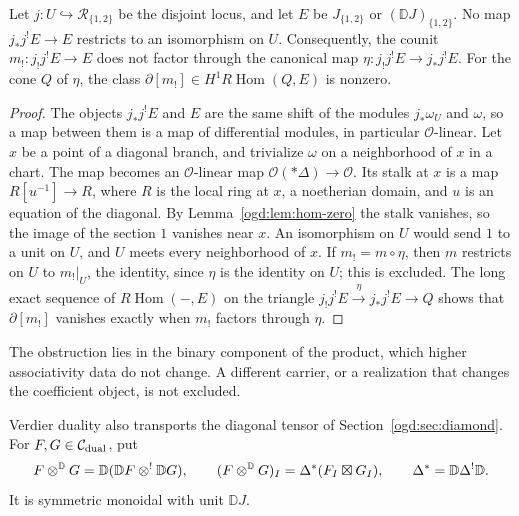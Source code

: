 \begin{corollary}\label{ogd:cor:no-extension}
Let \(j:U\hookrightarrow\mathscr R_{\{1,2\}}\) be the disjoint locus, and let \(E\) be \(J_{\{1,2\}}\) or \((\mathbb DJ)_{\{1,2\}}\).
No map \(j_*j^!E\to E\) restricts to an isomorphism on \(U\).
Consequently, the counit \(m_!:j_!j^!E\to E\) does not factor through the canonical map \(\eta:j_!j^!E\to j_*j^!E\).
For the cone \(Q\) of \(\eta\), the class \(\partial[m_!]\in H^1R\operatorname{Hom}(Q,E)\) is nonzero.
\end{corollary}
\begin{proof}
The objects \(j_*j^!E\) and \(E\) are the same shift of the modules \(j_*\omega_U\) and \(\omega\), so a map between them is a map of differential modules, in particular \(\mathcal O\)-linear.
Let \(x\) be a point of a diagonal branch, and trivialize \(\omega\) on a neighborhood of \(x\) in a chart.
The map becomes an \(\mathcal O\)-linear map \(\mathcal O(*\Delta)\to\mathcal O\).
Its stalk at \(x\) is a map \(R[u^{-1}]\to R\), where \(R\) is the local ring at \(x\), a noetherian domain, and \(u\) is an equation of the diagonal.
By Lemma~\ref{ogd:lem:hom-zero} the stalk vanishes, so the image of the section \(1\) vanishes near \(x\).
An isomorphism on \(U\) would send \(1\) to a unit on \(U\), and \(U\) meets every neighborhood of \(x\).
If \(m_!=m\circ\eta\), then \(m\) restricts on \(U\) to \(m_!|_U\), the identity, since \(\eta\) is the identity on \(U\); this is excluded.
The long exact sequence of \(R\operatorname{Hom}(-,E)\) on the triangle \(j_!j^!E\xrightarrow{\eta}j_*j^!E\to Q\) shows that \(\partial[m_!]\) vanishes exactly when \(m_!\) factors through \(\eta\).
\end{proof}

The obstruction lies in the binary component of the product, which higher associativity data do not change.
A different carrier, or a realization that changes the coefficient object, is not excluded.

Verdier\label{ogd:def:verdier-diagonal-tensor} duality also transports the diagonal tensor of Section~\ref{ogd:sec:diamond}.
For \(F,G\in\mathcal C_{\mathrm{dual}}\), put
\[
 F\mathbin{\otimes^{\mathbb D}} G=\mathbb D(\mathbb DF\mathbin{\otimes^!}\mathbb DG),\qquad
 (F\mathbin{\otimes^{\mathbb D}} G)_I=\Delta^*(F_I\boxtimes G_I),\qquad
 \Delta^*=\mathbb D\Delta^!\mathbb D.
\]
It is symmetric monoidal with unit \(\mathbb DJ\).

